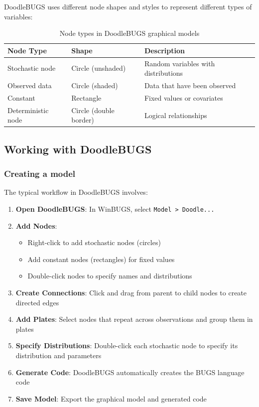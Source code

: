DoodleBUGS uses different node shapes and styles to represent different types of variables:
\begin{table}[H]
\centering
\begin{tabular}{|l|l|l|}
\hline
\textbf{Node Type} & \textbf{Shape} & \textbf{Description} \\
\hline
Stochastic node & Circle (unshaded) & Random variables with distributions \\
Observed data & Circle (shaded) & Data that have been observed \\
Constant & Rectangle & Fixed values or covariates \\
Deterministic node & Circle (double border) & Logical relationships \\
\hline
\end{tabular}
\caption{Node types in DoodleBUGS graphical models}
\end{table}

\subsection{Working with DoodleBUGS}

\subsubsection*{Creating a model}

The typical workflow in DoodleBUGS involves:
\begin{enumerate}
    \item \textbf{Open DoodleBUGS}: In WinBUGS, select \texttt{Model > Doodle...}
    \item \textbf{Add Nodes}:
    \begin{itemize}
        \item Right-click to add stochastic nodes (circles)
        \item Add constant nodes (rectangles) for fixed values
        \item Double-click nodes to specify names and distributions
    \end{itemize}
    \item \textbf{Create Connections}: Click and drag from parent to child nodes to create directed edges
    \item \textbf{Add Plates}: Select nodes that repeat across observations and group them in plates
    \item \textbf{Specify Distributions}: Double-click each stochastic node to specify its distribution and parameters
    \item \textbf{Generate Code}: DoodleBUGS automatically creates the BUGS language code
    \item \textbf{Save Model}: Export the graphical model and generated code
\end{enumerate}

